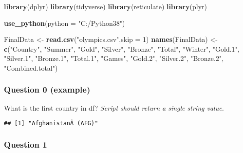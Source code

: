 \documentclass[
]{article}
\newenvironment{Shaded}{\begin{snugshade}}{\end{snugshade}}
\newcommand{\DataTypeTok}[1]{\textcolor[rgb]{0.13,0.29,0.53}{#1}}
\newcommand{\DecValTok}[1]{\textcolor[rgb]{0.00,0.00,0.81}{#1}}
\newcommand{\KeywordTok}[1]{\textcolor[rgb]{0.13,0.29,0.53}{\textbf{#1}}}
\newcommand{\NormalTok}[1]{#1}
\newcommand{\OperatorTok}[1]{\textcolor[rgb]{0.81,0.36,0.00}{\textbf{#1}}}
\newcommand{\StringTok}[1]{\textcolor[rgb]{0.31,0.60,0.02}{#1}}
\begin{document}
\begin{Shaded}
\begin{Highlighting}[]
\KeywordTok{library}\NormalTok{(dplyr)}
\KeywordTok{library}\NormalTok{(tidyverse)}
\KeywordTok{library}\NormalTok{(reticulate)}
\KeywordTok{library}\NormalTok{(plyr)}

\KeywordTok{use_python}\NormalTok{(}\DataTypeTok{python =} \StringTok{"C:/Python38"}\NormalTok{)}

\NormalTok{FinalData <-}\StringTok{ }\KeywordTok{read.csv}\NormalTok{(}\StringTok{"olympics.csv"}\NormalTok{,}\DataTypeTok{skip =} \DecValTok{1}\NormalTok{)}
\KeywordTok{names}\NormalTok{(FinalData) <-}\StringTok{ }\KeywordTok{c}\NormalTok{(}\StringTok{"Country"}\NormalTok{, }\StringTok{"Summer"}\NormalTok{, }\StringTok{"Gold"}\NormalTok{, }\StringTok{"Silver"}\NormalTok{, }\StringTok{"Bronze"}\NormalTok{, }\StringTok{"Total"}\NormalTok{, }\StringTok{"Winter"}\NormalTok{, }\StringTok{"Gold.1"}\NormalTok{, }\StringTok{"Silver.1"}\NormalTok{, }\StringTok{"Bronze.1"}\NormalTok{, }\StringTok{"Total.1"}\NormalTok{, }\StringTok{"Games"}\NormalTok{, }\StringTok{"Gold.2"}\NormalTok{, }\StringTok{"Silver.2"}\NormalTok{, }\StringTok{"Bronze.2"}\NormalTok{, }\StringTok{"Combined.total"}\NormalTok{)}
\end{Highlighting}
\end{Shaded}

\hypertarget{question-0-example}{%
\subsubsection{Question 0 (example)}\label{question-0-example}}

What is the first country in df? \emph{Script should return a single
string value.}

\begin{Shaded}
\end{Shaded}

\begin{verbatim}
## [1] "AfghanistanÂ (AFG)"
\end{verbatim}

\hypertarget{question-1}{%
\subsubsection{Question 1}\label{question-1}}
\end{document}
